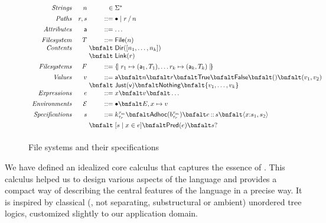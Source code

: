 \begin{figure}
\[
\begin{array}{rr@{\;}r@{\;}l}
\textit{Strings}        & n & \in & \Sigma^{\ast} \\[1ex]
\textit{Paths}          & r,s & \bnfdef & \PNil \mid \PCons{r}{n} \\[1ex]
\textit{Attributes}     & \att  & \bnfdef & \dots\\[1ex]
\textit{Filesystem}     & T  & \bnfdef & \File{n} \\
\textit{Contents}       &    & \bnfalt & \Dir{ \List{n_1,\dots,n_k} }\\
                        &    & \bnfalt & \Link{r}\\[1ex]
\textit{Filesystems}    & F & \bnfdef & \Map{ r_1 \mapsto (\att_1,T_1), \dots r_k \mapsto (\att_k,T_k) }\\[1ex]
\textit{Values}         & v & \bnfdef & \att \bnfalt n \bnfalt r \bnfalt \True \bnfalt \False \bnfalt () \bnfalt (v_1,v_2) \\
                        &   & \bnfalt & \Just{v} \bnfalt \Nothing \bnfalt \{ v_1,\dots,v_k \}\\
\textit{Expressions}    & e & \bnfdef & x \bnfalt v \bnfalt \dots \\[1ex]
\textit{Environments}   & \Env & \bnfdef & \ENil \bnfalt E,x\mapsto v \\[1ex]
\textit{Specifications} & s & \bnfdef & \Sk 
                              \bnfalt \SAdhoc{b}
                              \bnfalt \SPath{e}{s}
                              \bnfalt \SPair{x}{s_1}{s_2}\\[1ex]
                        &   & \bnfalt & \SComp{s}{x}{e}
                              \bnfalt \SPred{e}
                              \bnfalt \SOption{s}\\[1ex]
\end{array}
\]
\caption{File systems and their specifications}
\label{fig:calculus-syntax}
\end{figure}

We have defined an idealized core calculus that captures the
essence of \forest{}.  This calculus helped us to design various
aspects of the language and provides a compact way of describing the
central features of the language in a precise way.  It is inspired by
classical (\ie{}, not separating, substructural or ambient)
unordered tree logics, customized slightly to our application domain.

